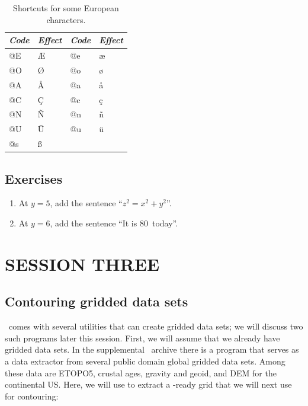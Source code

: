 \documentclass{report}
\begin{document}
\begin{table}[H]
\centering
\begin{tabular}{|l|l||l|l|} \hline
\emph{Code} & \emph{Effect}  & \emph{Code} & \emph{Effect} \\ \hline
@E &  \AE   & @e &  \ae   \\ \hline
@O &  \O    & @o &  \o    \\ \hline
@A &  \AA   & @a &  \aa   \\ \hline
@C &  \c{C} & @c &  \c{c} \\ \hline
@N &  \~{N} & @n &  \~{n} \\ \hline
@U &  \"{U} & @u &  \"{u} \\ \hline
@s &  \ss   &    &        \\ \hline
\end{tabular}
\caption{Shortcuts for some European characters.}
\label{tbl:scand}
\end{table}

\section{Exercises}

\begin{enumerate}

\item At $y = 5$, add the sentence ``$z^2 = x^2 + y^2$''.

\item At $y = 6$, add the sentence ``It is 80\DS\ today''.

\end{enumerate}

\chapter{SESSION THREE}
\thispagestyle{headings}

\section{Contouring gridded data sets}

\GMT\ comes with several utilities that can create gridded data
sets; we will discuss two such programs later this session.  First,
we will assume that we already have gridded data sets.  In the
supplemental \GMT\ archive there is a program that serves as a data
extractor from several public domain global gridded data sets.
Among these data are ETOPO5, crustal ages, gravity and geoid,
and DEM for the continental US.  Here, we will use 
to extract a \GMT-ready grid that we will next use for contouring:
\end{document}
